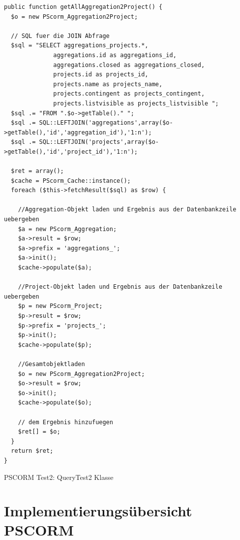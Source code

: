 \begin{fcode}
    \lstset{style=php}
    \begin{lstlisting}
public function getAllAggregation2Project() {
  $o = new PScorm_Aggregation2Project;

  // SQL fuer die JOIN Abfrage
  $sql = "SELECT aggregations_projects.*,
              aggregations.id as aggregations_id,
              aggregations.closed as aggregations_closed,
              projects.id as projects_id,
              projects.name as projects_name,
              projects.contingent as projects_contingent,
              projects.listvisible as projects_listvisible ";
  $sql .= "FROM ".$o->getTable()." ";
  $sql .= SQL::LEFTJOIN('aggregations',array($o->getTable(),'id','aggregation_id'),'1:n');
  $sql .= SQL::LEFTJOIN('projects',array($o->getTable(),'id','project_id'),'1:n');
  
  $ret = array();
  $cache = PScorm_Cache::instance();
  foreach ($this->fetchResult($sql) as $row) {
  
    //Aggregation-Objekt laden und Ergebnis aus der Datenbankzeile uebergeben
    $a = new PScorm_Aggregation;
    $a->result = $row;
    $a->prefix = 'aggregations_';
    $a->init();
    $cache->populate($a);
    
    //Project-Objekt laden und Ergebnis aus der Datenbankzeile uebergeben
    $p = new PScorm_Project;
    $p->result = $row;
    $p->prefix = 'projects_';      
    $p->init();
    $cache->populate($p);
    
    //Gesamtobjektladen
    $o = new PScorm_Aggregation2Project;
    $o->result = $row;
    $o->init();
    $cache->populate($o);
    
    // dem Ergebnis hinzufuegen
    $ret[] = $o;
  }
  return $ret;
}
    \end{lstlisting}
    \caption{PSCORM Test2: QueryTest2 Klasse}
\end{fcode}


\chapter{Implementierungsübersicht PSCORM}

